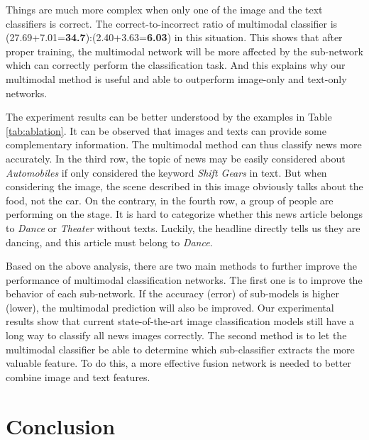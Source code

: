 \documentclass[10pt, a4paper]{article}
\begin{document}
Things are much more complex when only one of the image and the text classifiers is correct. The correct-to-incorrect ratio of multimodal classifier is (27.69+7.01=\textbf{34.7}):(2.40+3.63=\textbf{6.03}) in this situation. This shows that after proper training, the multimodal network will be more affected by the sub-network which can correctly perform the classification task. And this explains why our multimodal method is useful and able to outperform image-only and text-only networks.

The experiment results can be better understood by the examples in Table \ref{tab:ablation}. It can be observed that images and texts can provide some complementary information. The multimodal method can thus classify news more accurately. In the third row, the topic of news may be easily considered about \textit{Automobiles} if only considered the keyword \textit{Shift Gears} in text. But when considering the image, the scene described in this image obviously talks about the food, not the car. On the contrary, in the fourth row, a group of people are performing on the stage. It is hard to categorize whether this news article belongs to \textit{Dance} or \textit{Theater} without texts. Luckily, the headline directly tells us they are dancing, and this article must belong to \textit{Dance}.



Based on the above analysis, there are two main methods to further improve the performance of multimodal classification networks. The first one is to improve the behavior of each sub-network. If the accuracy (error) of sub-models is higher (lower), the multimodal prediction will also be improved. Our experimental results show that current state-of-the-art image classification models still have a long way to classify all news images correctly. The second method is to let the multimodal classifier be able to determine which sub-classifier extracts the more valuable feature. To do this, a more effective fusion network is needed to better combine image and text features.

\section{Conclusion}
\end{document}
